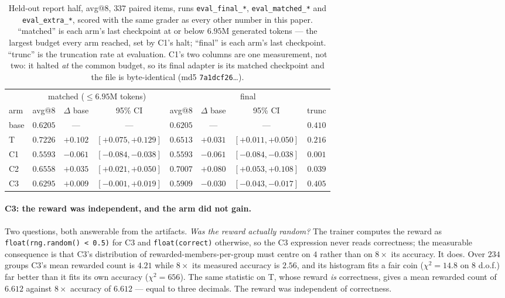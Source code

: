\begin{table}[t]
\centering\small
\caption{Held-out report half, avg@8, $337$ paired items, runs \texttt{eval\_final\_*},
\texttt{eval\_matched\_*} and \texttt{eval\_extra\_*}, scored with the same grader as every
other number in this paper. ``matched'' is each arm's last checkpoint at or below $6.95$M
generated tokens --- the largest budget every arm reached, set by C1's halt; ``final'' is each
arm's last checkpoint. ``trunc'' is the truncation rate at evaluation. C1's two columns are
one measurement, not two: it halted \emph{at} the common budget, so its final adapter is its
matched checkpoint and the file is byte-identical (md5 \texttt{7a1dcf26}\ldots).}
\label{tab:b200outcome}
\begin{tabular}{lccc@{\qquad}cccc}
\toprule
 & \multicolumn{3}{c}{matched ($\le 6.95$M tokens)} & \multicolumn{4}{c}{final} \\
arm & avg@8 & $\Delta$ base & 95\% CI & avg@8 & $\Delta$ base & 95\% CI & trunc \\
\midrule
base & $0.6205$ & --- & --- & $0.6205$ & --- & --- & $0.410$ \\
T    & $0.7226$ & $\mathbf{+0.102}$ & $[+0.075,+0.129]$
     & $0.6513$ & $+0.031$ & $[+0.011,+0.050]$ & $0.216$ \\
C1   & $0.5593$ & $\mathbf{-0.061}$ & $[-0.084,-0.038]$
     & $0.5593$ & $-0.061$ & $[-0.084,-0.038]$ & $0.001$ \\
C2   & $0.6558$ & $+0.035$ & $[+0.021,+0.050]$
     & $0.7007$ & $\mathbf{+0.080}$ & $[+0.053,+0.108]$ & $0.039$ \\
C3   & $0.6295$ & $+0.009$ & $[-0.001,+0.019]$
     & $0.5909$ & $-0.030$ & $[-0.043,-0.017]$ & $0.405$ \\
\bottomrule
\end{tabular}
\end{table}

\paragraph{C3: the reward was independent, and the arm did not gain.}
Two questions, both answerable from the artifacts. \emph{Was the reward actually random?} The
trainer computes the reward as \texttt{float(rng.random() < 0.5)} for C3 and
\texttt{float(correct)} otherwise, so the C3 expression never reads correctness; the measurable
consequence is that C3's distribution of rewarded-members-per-group must centre on $4$ rather
than on $8\times$ its accuracy. It does. Over $234$ groups C3's mean rewarded count is
$\mathbf{4.21}$ while $8\times$ its measured accuracy is $2.56$, and its histogram fits a fair
coin ($\chi^2=14.8$ on $8$ d.o.f.) far better than it fits its own accuracy ($\chi^2=656$).
The same statistic on T, whose reward \emph{is} correctness, gives a mean rewarded count of
$6.612$ against $8\times$ accuracy of $6.612$ --- equal to three decimals. The reward was
independent of correctness.

